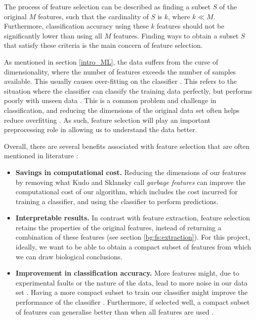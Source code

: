 \documentclass[12pt, twoside, a4paper]{report}
\begin{document}
The process of feature selection can be described as finding a subset $S$ of the original $M$ features, such that the cardinality of $S$ is $k$, where $k \ll M$. Furthermore, classification accuracy using these $k$ features should not be significantly lower than using all $M$ features. Finding ways to obtain a subset $S$ that satisfy these criteria is the main concern of feature selection.

As mentioned in section \ref{intro_ML}, the data suffers from the curse of dimensionality, where the number of features exceeds the number of samples available. This usually causes over-fitting on the classifier \cite{RefWorks:115, RefWorks:175}. This refers to the situation where the classifier can classify the training data perfectly, but performs poorly with unseen data \cite{RefWorks:98}. This is a common problem and challenge in classification, and reducing the dimensions of the original data set often helps reduce overfitting \cite{RefWorks:228}. As such, feature selection will play an important preprocessing role in allowing us to understand the data better.

Overall, there are several benefits associated with feature selection that are often mentioned in literature \cite{RefWorks:140}:
\begin{itemize}
  \item \textbf{Savings in computational cost.} Reducing the dimensions of our features by removing what Kudo and Sklansky call \textit{garbage features} \cite{RefWorks:210} can improve the computational cost of our algorithm, which includes the cost incurred for training a classifier, and using the classifier to perform predictions.
  \item \textbf{Interpretable results.} In contrast with feature extraction, feature selection retains the properties of the original features, instead of returning a combination of these features (see section \ref{bg:fs:extraction}). For this project, ideally, we want to be able to obtain a compact subset of features from which we can draw biological conclusions.
  \item \textbf{Improvement in classification accuracy.} More features might, due to experimental faults or the nature of the data, lead to more noise in our data set \cite{RefWorks:163, RefWorks:197}. Having a more compact subset to train our classifier might improve the performance of the classifier \cite{RefWorks:174}. Furthermore, if selected well, a compact subset of features can generalise better than when all features are used \cite{RefWorks:233}.
\end{itemize}
\end{document}
